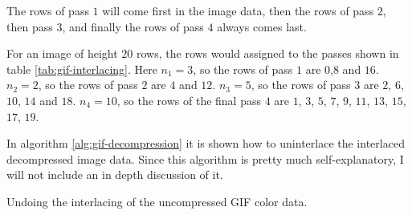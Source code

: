 The rows of pass $1$ will come first in the image data, then the rows
of pass $2$, then pass $3$, and finally the rows of pass $4$ always
comes last.

For an image of height $20$ rows, the rows would assigned to the
passes shown in table \ref{tab:gif-interlacing}. Here $n_1 =
3$, so the rows of pass $1$ are $0$,$8$ and $16$. $n_2 = 2$, so the
rows of pass $2$ are $4$ and $12$. $n_3 = 5$, so the rows of pass $3$
are $2$, $6$, $10$, $14$ and $18$. $n_4 = 10$, so the rows of the
final pass $4$ are $1$, $3$, $5$, $7$, $9$, $11$, $13$, $15$, $17$,
$19$.

In algorithm \ref{alg:gif-decompression} it is shown how to
uninterlace the interlaced decompressed image data. Since this
algorithm is pretty much self-explanatory, I will not include an in
depth discussion of it.

\begin{algorithm}[H]
  \caption{Undoing the interlacing of the uncompressed GIF color data.}
  \label{alg:gif-interlace}
  \begin{algorithmic}[1]






        \EndForTo


      \EndWhile

    \EndForTo

  \end{algorithmic}
\end{algorithm}



